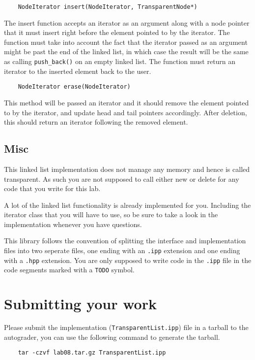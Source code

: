 \documentclass{article}
\begin{document}
\begin{lstlisting}
    NodeIterator insert(NodeIterator, TransparentNode*)
\end{lstlisting}
The insert function accepts an iterator as an argument along with a node
pointer that it must insert right before the element pointed to by the
iterator.  The function must take into account the fact that the iterator
passed as an argument might be past the end of the linked list, in which case
the result will be the same as calling \texttt{push\_back()} on an empty
linked list.  The function must return an iterator to the inserted element
back to the user.

\begin{lstlisting}
    NodeIterator erase(NodeIterator)
\end{lstlisting}
This method will be passed an iterator and it should remove the element
pointed to by the iterator, and update head and tail pointers accordingly.
After deletion, this should return an iterator following the removed element.

\bigskip
\subsection{Misc}

This linked list implementation does not manage any memory and hence is called
transparent.  As such you are not supposed to call either new or delete for
any code that you write for this lab.

A lot of the linked list functionality is already implemented for you.
Including the iterator class that you will have to use, so be sure to take a
look in the implementation whenever you have questions.

This library follows the convention of splitting the interface and
implementation files into two seperate files, one ending with an \texttt{.ipp}
extension and one ending with a \texttt{.hpp} extension.  You are only
supposed to write code in the \texttt{.ipp} file in the code segments marked
with a \texttt{TODO} symbol.

\newpage
\section{Submitting your work}
Please submit the implementation (\texttt{TransparentList.ipp}) file in a
tarball to the autograder, you can use the following command to generate the
tarball.
\begin{lstlisting}
    tar -czvf lab08.tar.gz TransparentList.ipp
\end{lstlisting}
\end{document}
